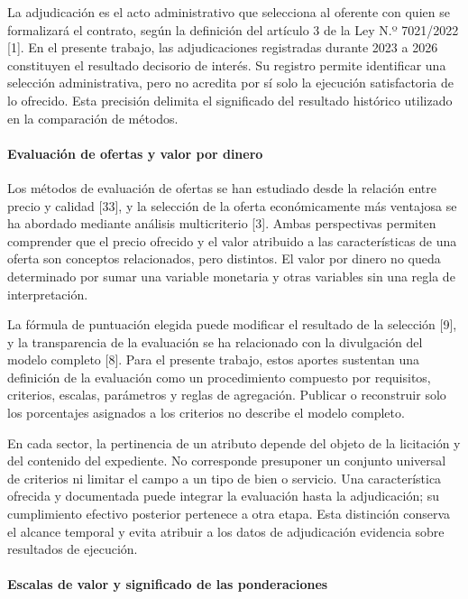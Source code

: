 \documentclass[12pt,a4paper]{article}
\begin{document}
La adjudicación es el acto administrativo que selecciona al oferente con quien se formalizará el contrato, según la definición del artículo 3 de la Ley N.º 7021/2022 [1]. En el presente trabajo, las adjudicaciones registradas durante 2023 a 2026 constituyen el resultado decisorio de interés. Su registro permite identificar una selección administrativa, pero no acredita por sí solo la ejecución satisfactoria de lo ofrecido. Esta precisión delimita el significado del resultado histórico utilizado en la comparación de métodos.

\paragraph{Evaluación de ofertas y valor por dinero}

Los métodos de evaluación de ofertas se han estudiado desde la relación entre precio y calidad [33], y la selección de la oferta económicamente más ventajosa se ha abordado mediante análisis multicriterio [3]. Ambas perspectivas permiten comprender que el precio ofrecido y el valor atribuido a las características de una oferta son conceptos relacionados, pero distintos. El valor por dinero no queda determinado por sumar una variable monetaria y otras variables sin una regla de interpretación.

La fórmula de puntuación elegida puede modificar el resultado de la selección [9], y la transparencia de la evaluación se ha relacionado con la divulgación del modelo completo [8]. Para el presente trabajo, estos aportes sustentan una definición de la evaluación como un procedimiento compuesto por requisitos, criterios, escalas, parámetros y reglas de agregación. Publicar o reconstruir solo los porcentajes asignados a los criterios no describe el modelo completo.

En cada sector, la pertinencia de un atributo depende del objeto de la licitación y del contenido del expediente. No corresponde presuponer un conjunto universal de criterios ni limitar el campo a un tipo de bien o servicio. Una característica ofrecida y documentada puede integrar la evaluación hasta la adjudicación; su cumplimiento efectivo posterior pertenece a otra etapa. Esta distinción conserva el alcance temporal y evita atribuir a los datos de adjudicación evidencia sobre resultados de ejecución.

\paragraph{Escalas de valor y significado de las ponderaciones}
\end{document}
